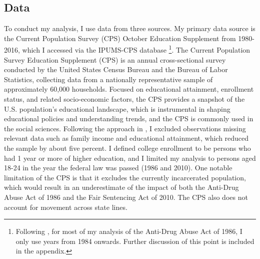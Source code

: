 \documentclass{article}
\begin{document}
\subsection{Data}
To conduct my analysis, I use data from three sources. My primary data source is the Current Population Survey (CPS) October Education Supplement from 1980-2016, which I accessed via the IPUMS-CPS database \citep{ipums_cps} \footnote{Following \cite{britton2022}, for most of my analysis of the Anti-Drug Abuse Act of 1986, I only use years from 1984 onwards. Further discussion of this point is included in the appendix.}. The Current Population Survey Education Supplement (CPS) is an annual cross-sectional survey conducted by the United States Census Bureau and the Bureau of Labor Statistics, collecting data from a nationally representative sample of approximately 60,000 households. Focused on educational attainment, enrollment status, and related socio-economic factors, the CPS provides a snapshot of the U.S. population's educational landscape, which is instrumental in shaping educational policies and understanding trends, and the CPS is commonly used in the social sciences. Following the approach in \cite{britton2022}, I excluded observations missing relevant data such as family income and educational attainment, which reduced the sample by about five percent. I defined college enrollment to be persons who had 1 year or more of higher education, and I limited my analysis to persons aged 18-24 in the year the federal law was passed (1986 and 2010). One notable limitation of the CPS is that it excludes the currently incarcerated population, which would result in an underestimate of the impact of both the Anti-Drug Abuse Act of 1986 and the Fair Sentencing Act of 2010. The CPS also does not account for movement across state lines.
\end{document}
